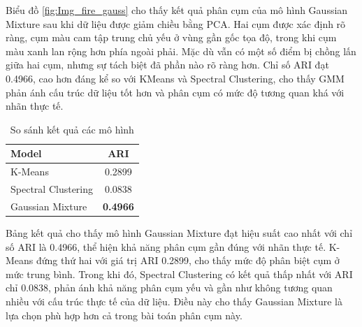      Biểu đồ \ref{fig:Img_fire_gauss} cho thấy kết quả phân cụm của mô hình Gaussian Mixture sau khi dữ liệu được giảm chiều bằng PCA. Hai cụm được xác định rõ ràng, cụm màu cam tập trung chủ yếu ở vùng gần gốc tọa độ, trong khi cụm màu xanh lan rộng hơn phía ngoài phải. Mặc dù vẫn có một số điểm bị chồng lấn giữa hai cụm, nhưng sự tách biệt đã phần nào rõ ràng hơn. Chỉ số ARI đạt 0.4966, cao hơn đáng kể so với KMeans và Spectral Clustering, cho thấy GMM phản ánh cấu trúc dữ liệu tốt hơn và phân cụm có mức độ tương quan khá với nhãn thực tế.

    \begin{table}[htbp]
        \centering
        \caption{So sánh kết quả các mô hình}
        \label{tab:lung-clustering-compare}
        \begin{tabular}{|l|c|}
        \hline
        Model & ARI  \\
        \hline
        K-Means & 0.2899  \\
        \hline
        Spectral Clustering & 0.0838 \\
        \hline
        Gaussian Mixture & \textbf{0.4966}  \\
        \hline
        \end{tabular}
    \end{table}

    \FloatBarrier

    Bảng kết quả cho thấy mô hình Gaussian Mixture đạt hiệu suất cao nhất với chỉ số ARI là 0.4966, thể hiện khả năng phân cụm gần đúng với nhãn thực tế. K-Means đứng thứ hai với giá trị ARI 0.2899, cho thấy mức độ phân biệt cụm ở mức trung bình. Trong khi đó, Spectral Clustering có kết quả thấp nhất với ARI chỉ 0.0838, phản ánh khả năng phân cụm yếu và gần như không tương quan nhiều với cấu trúc thực tế của dữ liệu. Điều này cho thấy Gaussian Mixture là lựa chọn phù hợp hơn cả trong bài toán phân cụm này.